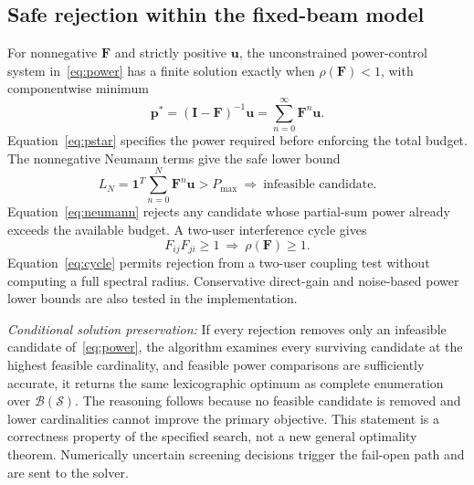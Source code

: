 \documentclass[journal]{IEEEtran}
\begin{document}
\subsection{Safe rejection within the fixed-beam model}
For nonnegative $\mathbf F$ and strictly positive $\mathbf u$, the unconstrained power-control system in~\eqref{eq:power} has a finite solution exactly when $\rho(\mathbf F)<1$, with componentwise minimum
\begin{equation}
\mathbf p^*=(\mathbf I-\mathbf F)^{-1}\mathbf u
=\sum_{n=0}^{\infty}\mathbf F^n\mathbf u.
\label{eq:pstar}
\end{equation}
Equation~\eqref{eq:pstar} specifies the power required before enforcing the total budget. The nonnegative Neumann terms give the safe lower bound
\begin{equation}
L_N=\mathbf1^T\sum_{n=0}^{N}\mathbf F^n\mathbf u
>P_{\max}\ \Longrightarrow\ \text{infeasible candidate}.
\label{eq:neumann}
\end{equation}
Equation~\eqref{eq:neumann} rejects any candidate whose partial-sum power already exceeds the available budget. A two-user interference cycle gives
\begin{equation}
F_{ij}F_{ji}\geq1\ \Longrightarrow\ \rho(\mathbf F)\geq1.
\label{eq:cycle}
\end{equation}
Equation~\eqref{eq:cycle} permits rejection from a two-user coupling test without computing a full spectral radius. Conservative direct-gain and noise-based power lower bounds are also tested in the implementation.

\emph{Conditional solution preservation:} If every rejection removes only an infeasible candidate of~\eqref{eq:power}, the algorithm examines every surviving candidate at the highest feasible cardinality, and feasible power comparisons are sufficiently accurate, it returns the same lexicographic optimum as complete enumeration over $\mathcal B(\mathcal S)$. The reasoning follows because no feasible candidate is removed and lower cardinalities cannot improve the primary objective. This statement is a correctness property of the specified search, not a new general optimality theorem. Numerically uncertain screening decisions trigger the fail-open path and are sent to the solver.
\end{document}
